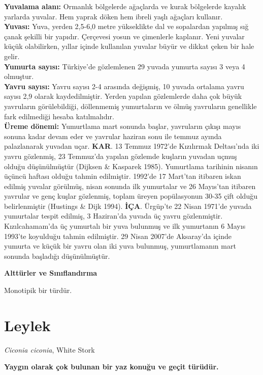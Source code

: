 \documentclass[
  letterpaper,
  DIV=11,
  numbers=noendperiod]{scrreprt}
\begin{document}
\textbf{Yuvalama alanı:} Ormanlık bölgelerde ağaçlarda ve kurak
bölgelerde kayalık yarlarda yuvalar. Hem yaprak döken hem ibreli yaşlı
ağaçları kullanır.\\
\textbf{Yuvası:} Yuva, yerden 2,5-6,0 metre yükseklikte dal ve
sopalardan yapılmış sığ çanak şekilli bir yapıdır. Çerçevesi yosun ve
çimenlerle kaplanır. Yeni yuvalar küçük olabilirken, yıllar içinde
kullanılan yuvalar büyür ve dikkat çeken bir hale gelir.\\
\textbf{Yumurta sayısı:} Türkiye'de gözlemlenen 29 yuvada yumurta sayısı
3 veya 4 olmuştur.\\
\textbf{Yavru sayısı:} Yavru sayısı 2-4 arasında değişmiş, 10 yuvada
ortalama yavru sayısı 2,9 olarak kaydedilmiştir. Yerden yapılan
gözlemlerde daha çok büyük yavruların görülebildiği, döllenmemiş
yumurtaların ve ölmüş yavruların genellikle fark edilmediği hesaba
katılmalıdır.\\
\textbf{Üreme dönemi:} Yumurtlama mart sonunda başlar, yavruların çıkışı
mayıs sonuna kadar devam eder ve yavrular haziran sonu ile temmuz ayında
palazlanarak yuvadan uçar. \textbf{KAR}. 13 Temmuz 1972'de Kızılırmak
Deltası'nda iki yavru gözlenmiş, 23 Temmuz'da yapılan gözlemde kuşların
yuvadan uçmuş olduğu düşünülmüştür (Dijksen \& Kasparek 1985).
Yumurtlama tarihinin nisanın üçüncü haftası olduğu tahmin edilmiştir.
1992'de 17 Mart'tan itibaren iskan edilmiş yuvalar görülmüş, nisan
sonunda ilk yumurtalar ve 26 Mayıs'tan itibaren yavrular ve genç kuşlar
gözlenmiş, toplam üreyen popülasyonun 30-35 çift olduğu belirlenmiştir
(Hustings \& Dijk 1994). \textbf{İÇA}. Ürgüp'te 22 Nisan 1971'de yuvada
yumurtalar tespit edilmiş, 3 Haziran'da yuvada üç yavru gözlenmiştir.
Kızılcahamam'da üç yumurtalı bir yuva bulunmuş ve ilk yumurtanın 6 Mayıs
1993'te koyulduğu tahmin edilmiştir. 29 Nisan 2007'de Aksaray'da içinde
yumurta ve küçük bir yavru olan iki yuva bulunmuş, yumurtlamanın mart
sonunda başladığı düşünülmüştür.

\textbf{Alttürler ve Sınıflandırma}

Monotipik bir türdür.

\section{Leylek}\label{leylek}

\emph{Ciconia ciconia}, White Stork

\textbf{Yaygın olarak çok bulunan bir yaz konuğu ve geçit türüdür.}
\end{document}
